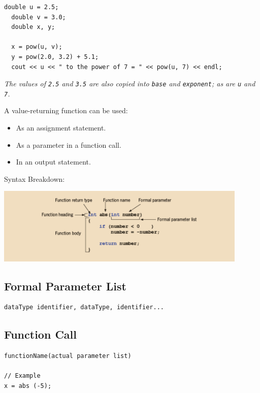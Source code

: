 \documentclass{article}
\begin{document}
\begin{lstlisting}[caption={\texttt{pow} Actual Parameter Example}]
  double u = 2.5;
  double v = 3.0;
  double x, y;

  x = pow(u, v);
  y = pow(2.0, 3.2) + 5.1;
  cout << u << " to the power of 7 = " << pow(u, 7) << endl;
\end{lstlisting}

\textit{The values of \texttt{2.5} and \texttt{3.5} are also copied into \texttt{base}
and \texttt{exponent}; as are \texttt{u} and \texttt{7}.}

\vspace{8pt}
A value-returning function can be used:
\begin{itemize}
  \item As an assignment statement.
  \item As a parameter in a function call.
  \item In an output statement.
\end{itemize}

Syntax Breakdown:
\begin{center}
    \includegraphics[width=0.9\textwidth]{val-ret-func-syntax.png}
\end{center}
 
\subsection{Formal Parameter List}
\begin{lstlisting}[caption={Formal Parameter List Syntax}]
dataType identifier, dataType, identifier...
\end{lstlisting}

\subsection{Function Call}
\begin{lstlisting}[caption={Value-Returning Function Syntax \& Example}]
functionName(actual parameter list)

// Example
x = abs (-5);
\end{lstlisting}
\end{document}

